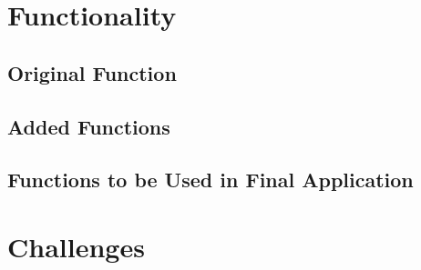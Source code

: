 \documentclass[conference]{IEEEtran}
\begin{document}
\section{Functionality}

\subsection{Original Function}

\subsection{Added Functions}

\subsection{Functions to be Used in Final Application}

\section{Challenges}
\end{document}
